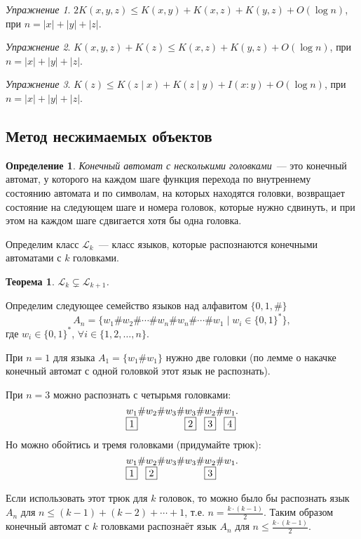 \documentclass[12pt]{article}
\newcommand{\bits}{\{0,1\}}
\newcommand{\bitstr}{\bits^*}
\theoremstyle{definition}
\newtheorem{definition}{Определение}[section]
\theoremstyle{plain}
\newtheorem{theorem}{Теорема}[section]
\theoremstyle{remark}
\newtheorem{exercise}{Упражнение}[section]
\begin{document}
\begin{exercise}
    $2K(x,y,z)\le K(x,y) + K(x,z) + K(y,z) + O(\log n)$, при $n = |x|+|y|+|z|$.
\end{exercise}
\begin{exercise}
    $K(x,y,z) + K(z)\le K(x,z) + K(y,z) + O(\log n)$, при $n = |x|+|y|+|z|$.
\end{exercise}
\begin{exercise}
    $K(z)\le K(z\mid x) + K(z\mid y) + I(x:y) + O(\log n)$, при $n = |x|+|y|+|z|$.
\end{exercise}

\subsection{Метод несжимаемых объектов}
\begin{definition}
    \emph{Конечный автомат с несколькими головками}~--- это конечный автомат, у
    которого на каждом шаге функция перехода по внутреннему состоянию автомата
    и по символам, на которых находятся головки, возвращает состояние на
    следующем шаге и номера головок, которые нужно сдвинуть, и при этом на каждом 
    шаге сдвигается хотя бы одна головка.
\end{definition}
    Определим класс $\mathcal L_k$~--- класс языков, которые распознаются
    конечными автоматами с $k$ головками.
\begin{theorem}\label{thm:kDFA}
    $\mathcal L_k \subsetneq \mathcal L_{k+1}$.
\end{theorem}

Определим следующее семейство языков над алфавитом $\{0,1,\#\}$
\[
A_n = \{w_1\#w_2\#\dotsb\#w_n\#w_n\#\dotsb\#w_1\mid w_i\in\bitstr\},
\]
где $w_i\in\bitstr$, $\forall i\in\{1,2,\dotsc,n\}$.

При $n = 1$ для языка $A_1 = \{w_1\#w_1\}$ нужно две головки (по лемме о накачке 
конечный автомат с одной головкой этот язык не распознать).

При $n = 3$ можно распознать с четырьмя головками:
\[
\underset{\fbox{1}}{w_1}\#w_2\#w_3\#\underset{\fbox{2}}{w_3}\#\underset{\fbox{3}}{w_2}\#\underset{\fbox{4}}{w_1}.
\]
Но можно обойтись и тремя головками (придумайте трюк):
\[
\underset{\fbox{1}}{w_1}\#\underset{\fbox{2}}{w_2}\#w_3\#w_3\#\underset{\fbox{3}}{w_2}\#w_1.
\]

Если использовать этот трюк для $k$ головок, то можно было бы распознать
язык $A_n$ для $n \le (k-1) + (k-2) + \dotsb + 1$, т.е. $n =
\frac{k\cdot(k-1)}{2}$. Таким образом конечный автомат с $k$ головками 
распознаёт язык $A_n$ для $n \le \frac{k\cdot(k-1)}{2}$.
\end{document}
